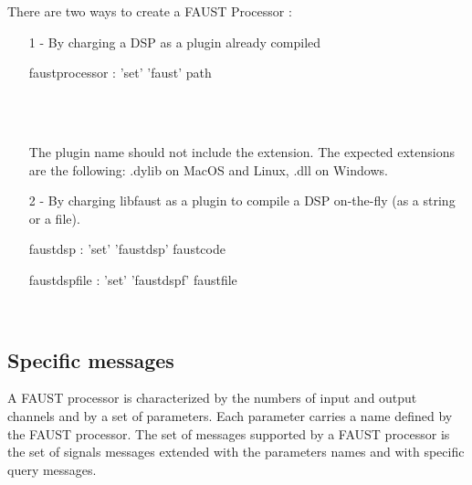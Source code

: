 \documentclass[a4paper,twoside]{report}
\newcommand{\subsublevel}[1]	{\subsection{#1}}
\begin{document}
There are two ways to create a FAUST Processor : 
\begin{itemize}
\item [1]- By charging a DSP as a plugin already compiled \\


\begin{rail}
faustprocessor : 'set' 'faust' path
\end{rail}

\example \\

\note{} \\
The plugin name should not include the extension. The expected extensions are the following: .dylib on MacOS and Linux, .dll on Windows. \\

\item [2]- By charging libfaust as a plugin to compile a DSP on-the-fly  (as a string or a file). \\


\begin{rail}
faustdsp : 'set' 'faustdsp' faustcode
\end{rail}

\vspace{0.3cm}


\begin{rail}
faustdspfile : 'set' 'faustdspf' faustfile
\end{rail}

\example \\

\end{itemize}

\subsublevel{Specific messages}
\label{faustmsg}
A FAUST processor is characterized by the numbers of input and output channels and by a set of parameters. Each parameter carries a name defined by the FAUST processor. The set of messages supported by a FAUST processor is the set of signals messages extended with the parameters names and with specific query messages. 
\end{document}
